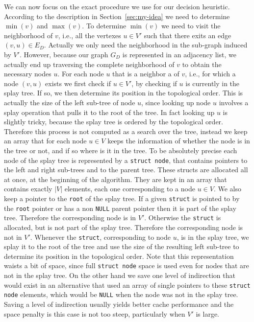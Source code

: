 \documentclass[a4paper]{article}
\begin{document}
We can now focus on the exact procedure we use for our decision
heuristic. According to the description in Section~\ref{sec:my-idea} we
need to determine $\min(v)$ and $\max(v)$. To determine $\min(v)$ we need
to visit the neighborhood of $v$, i.e., all the vertexes $u \in V'$ such
that there exits an edge $(v, u) \in E_D$. Actually we only need the
neighborhood in the sub-graph induced by $V'$. However, because our graph
$G_D$ is represented in an adjacency list, we actually end up traversing
the complete neighborhood of $v$ to obtain the necessary nodes $u$. For
each node $u$ that is a neighbor a of $v$, i.e., for which a node $(v,u)$
exists we first check if $u \in V'$, by checking if $u$ is currently in the
splay tree. If so, we then determine its position in the topological order.
This is actually the size of the left sub-tree of node $u$, since looking
up node $u$ involves a splay operation that pulls it to the root of the
tree. In fact looking up $u$ is slightly tricky, because the splay tree is
ordered by the topological order. Therefore this process is not computed as
a search over the tree, instead we keep an array that for each node
$u \in V$ keeps the information of whether the node is in the tree or not,
and if so where is it in the tree. To be absolutely precise each node of
the splay tree is represented by a \texttt{struct node}, that contains
pointers to the left and right sub-trees and to the parent tree. These
structs are allocated all at once, at the beginning of the algorithm. They
are kept in an array that contains exactly $|V|$ elements, each one
corresponding to a node $u \in V$. We also keep a pointer to the
\texttt{root} of the splay tree. If a given \texttt{struct} is pointed to
by the \texttt{root} pointer or has a non \texttt{NULL} parent pointer then
it is part of the splay tree. Therefore the corresponding node is in
$V'$. Otherwise the \texttt{struct} is allocated, but is not part of the
splay tree. Therefore the corresponding node is not in $V'$. Whenever the
\texttt{struct}, corresponding to node $u$, is in the splay tree, we splay
it to the root of the tree and use the size of the resulting left sub-tree
to determine its position in the topological order. Note that this
representation waists a bit of space, since full \texttt{struct node} space
is used even for nodes that are not in the splay tree. On the other hand we
save one level of indirection that would exist in an alternative that used
an array of single pointers to these \texttt{struct node} elements, which
would be \texttt{NULL} when the node was not in the splay tree. Saving a
level of indirection usually yields better cache performance and the space
penalty is this case is not too steep, particularly when $V'$ is large.
\end{document}

